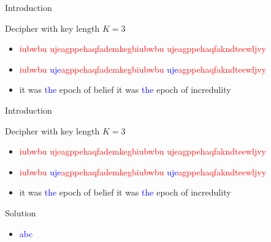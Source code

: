 \documentclass{beamer}
\begin{document}

\begin{frame}{Introduction}

\begin{block}{Decipher with key length $K=3$}
\begin{itemize}
\item \textcolor{red}{iubwbu ujeagppehaqfademkegbiubwbu ujeagppehaqfakndteewljvy}
\item \textcolor{red}{iubwbu }\textcolor{blue}{uje}\textcolor{red}{agppehaqfademkegbiubwbu }\textcolor{blue}{uje}\textcolor{red}{agppehaqfakndteewljvy}
\item it was \textcolor{blue}{the} epoch of belief it was \textcolor{blue}{the} epoch of incredulity
\end{itemize}
\end{block}

\end{frame}


\begin{frame}{Introduction}

\begin{block}{Decipher with key length $K=3$}
\begin{itemize}
\item \textcolor{red}{iubwbu ujeagppehaqfademkegbiubwbu ujeagppehaqfakndteewljvy}
\item \textcolor{red}{iubwbu }\textcolor{blue}{uje}\textcolor{red}{agppehaqfademkegbiubwbu }\textcolor{blue}{uje}\textcolor{red}{agppehaqfakndteewljvy}
\item it was \textcolor{blue}{the} epoch of belief it was \textcolor{blue}{the} epoch of incredulity
\end{itemize}
\end{block}

\begin{block}{Solution}
\begin{itemize}
\item \textcolor{blue}{abc}
\end{itemize}
\end{block}

\end{frame}

\end{document}
